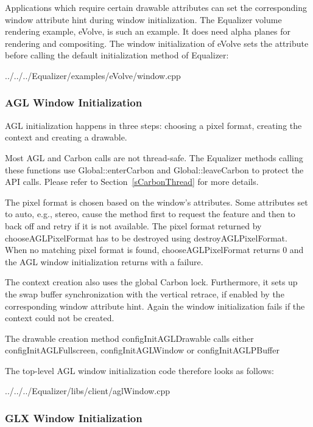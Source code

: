 \documentclass[10pt,a4]{scrartcl}
\newcommand{\sref}[1]{Section~\ref{#1}}
\begin{document}
Applications which require certain drawable attributes can set the
corresponding window attribute hint during window initialization. The
Equalizer volume rendering example, \textsf{eVolve}, is such an
example. It does need alpha planes for rendering and compositing. The
window initialization of \textsf{eVolve} sets the attribute before
calling the default initialization method of Equalizer:

{\footnotesize
  {../../../Equalizer/examples/eVolve/window.cpp}}


\subsubsection{AGL Window Initialization}

AGL initialization happens in three steps: choosing a pixel format,
creating the context and creating a drawable. 

Most AGL and Carbon calls are not thread-safe. The Equalizer methods
calling these functions use \textsf{Global::enterCarbon} and
\textsf{Global::leaveCarbon} to protect the API calls. Please refer to
\sref{sCarbonThread} for more details.

The pixel format is chosen based on the window's attributes. Some
attributes set to auto, e.g., stereo, cause the method first to request
the feature and then to back off and retry if it is not available. The
pixel format returned by \textsf{chooseAGLPixelFormat} has to be
destroyed using \textsf{destroyAGLPixelFormat}. When no matching pixel
format is found, \textsf{chooseAGLPixelFormat} returns \textsf{0} and
the AGL window initialization returns with a failure.

The context creation also uses the global Carbon lock. Furthermore, it
sets up the swap buffer synchronization with the vertical retrace, if
enabled by the corresponding window attribute hint. Again the window
initialization fails if the context could not be created.

The drawable creation method \textsf{configInitAGLDrawable} calls either
\textsf{configInitAGLFullscreen}, \textsf{configInitAGLWindow} or \textsf{configInitAGLPBuffer}

The top-level AGL window initialization code therefore looks as follows:

{\footnotesize
  {../../../Equalizer/libs/client/aglWindow.cpp}}


\subsubsection{GLX Window Initialization}
\end{document}

